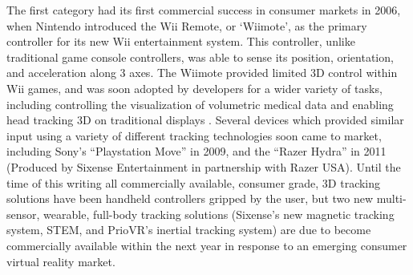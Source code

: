 The first category had its first commercial success in consumer markets in 2006, when Nintendo introduced the Wii Remote, or ‘Wiimote’, as the primary controller for its new Wii entertainment system. This controller, unlike traditional game console controllers, was able to sense its position, orientation, and acceleration along 3 axes. The Wiimote provided limited 3D control within Wii games, and was soon adopted by developers for a wider variety of tasks, including controlling the visualization of volumetric medical data \cite{wiimote-medical} and enabling head tracking 3D on traditional displays \cite{hacking-the-wiimote}. Several devices which provided similar input using a variety of different tracking technologies soon came to market, including Sony’s “Playstation Move” in 2009, and the “Razer Hydra” in 2011 (Produced by Sixense Entertainment in partnership with Razer USA). Until the time of this writing all commercially available, consumer grade, 3D tracking solutions have been handheld controllers gripped by the user, but two new multi-sensor, wearable, full-body tracking solutions (Sixense’s new magnetic tracking system, STEM, and PrioVR’s inertial tracking system) are due to become commercially available within the next year in response to an emerging consumer virtual reality market.
 
